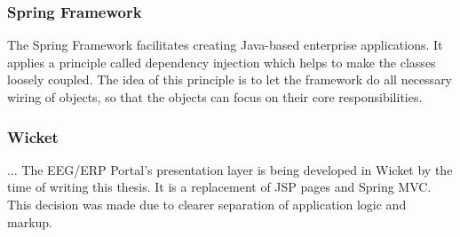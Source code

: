 \subsubsection*{Spring Framework}

The Spring Framework facilitates creating Java-based enterprise applications. It applies a principle called dependency injection which helps to make the classes loosely coupled. The idea of this principle is to let the framework do all necessary wiring of objects, so that the objects can focus on their core responsibilities. 

\subsubsection*{Wicket}

... The EEG/ERP Portal's presentation layer is being developed in Wicket by the time of writing this thesis. It is a replacement of JSP pages and Spring MVC. This decision was made due to clearer separation of application logic and markup.
